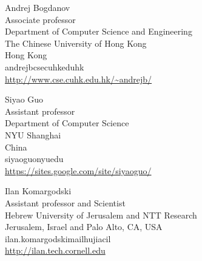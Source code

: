 \documentclass{toc}
\begin{document}
%
%
%
%
%
\begin{tocauthors}
\begin{tocinfo}[Bogdanov]
  Andrej Bogdanov\\
  Associate professor\\
  Department of Computer Science and Engineering\\
  The Chinese University of Hong Kong\\
  Hong Kong\\
  andrejb\tocat{}cse\tocdot{}cuhk\tocdot{}edu\tocdot{}hk \\ %
  \url{http://www.cse.cuhk.edu.hk/~andrejb/} %
\end{tocinfo}
\begin{tocinfo}[Guo]
  Siyao Guo\\
  Assistant professor\\
  Department of Computer Science\\
  NYU Shanghai\\
  China\\
  siyao\tocdot{}guo\tocat{}nyu\tocdot{}edu \\
  \url{https://sites.google.com/site/siyaoguo/}
\end{tocinfo}
\begin{tocinfo}[Komargodski]
  Ilan Komargodski\\
  Assistant professor and Scientist\\
  Hebrew University of Jerusalem and NTT Research\\
  Jerusalem, Israel and Palo Alto, CA, USA \\
  ilan.komargodski\tocat{}mail\tocdot{}huji\tocdot{}ac\tocdot{}il \\
  \url{http://ilan.tech.cornell.edu}
\end{tocinfo}
\end{tocauthors}
\end{document}
